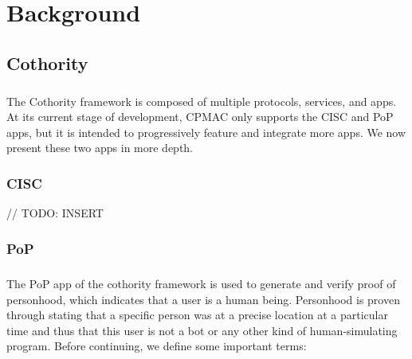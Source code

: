 \chapter{Background}
\section{Cothority}

\paragraph{}
The Cothority framework is composed of multiple protocols, services, and apps. At its current stage of development, CPMAC only supports the CISC and PoP apps, but it is intended to progressively feature and integrate more apps. We now present these two apps in more depth.

\subsection{CISC}

// TODO: INSERT

\subsection{PoP}

\paragraph{}
The PoP app of the cothority framework is used to generate and verify proof of personhood, which indicates that a user is a human being. Personhood is proven through stating that a specific person was at a precise location at a particular time and thus that this user is not a bot or any other kind of human-simulating program. Before continuing, we define some important terms:

